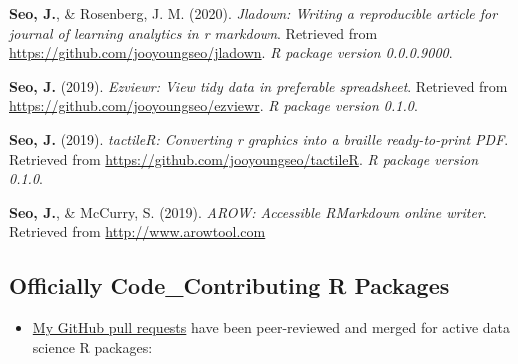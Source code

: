 \documentclass[11pt,a4paper,]{awesome-cv}
\providecommand{\tightlist}{%
	\setlength{\itemsep}{0pt}\setlength{\parskip}{0pt}}
\begin{document}
\leavevmode{}%
\textbf{Seo, J.}, \& Rosenberg, J. M. (2020). \emph{Jladown: Writing a
    reproducible article for journal of learning analytics in r markdown}.
Retrieved from \url{https://github.com/jooyoungseo/jladown}. \emph{R
    package version 0.0.0.9000}.

\leavevmode{}%
\textbf{Seo, J.} (2019). \emph{Ezviewr: View tidy data in preferable
    spreadsheet}. Retrieved from
\url{https://github.com/jooyoungseo/ezviewr}. \emph{R package version
    0.1.0}.

\leavevmode{}%
\textbf{Seo, J.} (2019). \emph{tactileR: Converting r graphics into a
    braille ready-to-print PDF}. Retrieved from
\url{https://github.com/jooyoungseo/tactileR}. \emph{R package version
    0.1.0}.

\leavevmode{}%
\textbf{Seo, J.}, \& McCurry, S. (2019). \emph{AROW: Accessible
    RMarkdown online writer}. Retrieved from \url{http://www.arowtool.com}

\hypertarget{officially-code_contributing-r-packages}{%
    \subsection{Officially Code\_Contributing R
        Packages}\label{officially-code_contributing-r-packages}}

\begin{itemize}
    \tightlist
    \item
          \href{https://github.com/pulls?q=is\%3Apr+author\%3Ajooyoungseo+archived\%3Afalse+is\%3Aclosed}{My
              GitHub pull requests} have been peer-reviewed and merged for active
          data science R packages:
\end{itemize}
\end{document}
